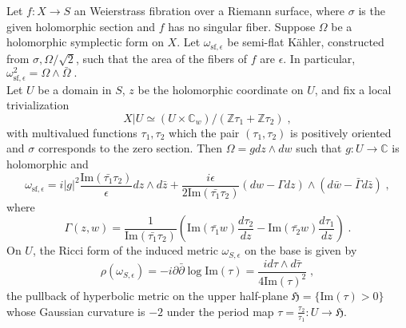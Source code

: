 \begin{prop}
Let $f\colon X\rightarrow S$ an Weierstrass fibration over a Riemann surface, where $\sigma$ is the given holomorphic section and $f$ has no singular fiber. Suppose $\Omega$ be a holomorphic symplectic form on $X$. Let $\omega_{\textrm{sf},\epsilon}$ be semi-flat K{\"a}hler, constructed from $\sigma,\Omega/\sqrt{2}$, such that the area of the fibers of $f$ are $\epsilon$. In particular, $\omega_{\textrm{sf},\epsilon}^2=\Omega\wedge\bar{\Omega}\; .$\\ \indent
Let $U$ be a domain in $S$, $z$ be the holomorphic coordinate on $U$, and fix a local trivialization $$X|U\simeq (U\times \mathbb{C}_w)/(\mathbb{Z}\tau_1+\mathbb{Z}\tau_2)\; ,$$ 
with multivalued functions $\tau_1,\tau_2$ which the pair $(\tau_1,\tau_2)$ is positively oriented and $\sigma$ corresponds to the zero section. Then $\Omega=gdz\wedge dw$ such that $g:U\rightarrow\mathbb{C}$ is holomorphic and
$$\omega_{\textrm{sf},\epsilon}=i|g|^2\frac{\textrm{Im} (\bar{\tau_1}\tau_2)}{\epsilon}dz\wedge d\bar{z}+\frac{i\epsilon}{2\textrm{Im} (\bar{\tau_1}\tau_2)}(dw-\Gamma dz)\wedge(d\bar{w}-\bar{\Gamma}d\bar{z})\; ,$$
where
$$\Gamma(z,w)=\frac{1}{\textrm{Im} (\bar{\tau_1}\tau_2)}\left(\textrm{Im} (\bar{\tau_1}w)\frac{d\tau_2}{dz}-\textrm{Im} (\bar{\tau_2}w)\frac{d\tau_1}{dz}\right)\; .$$
\indent On $U$, the Ricci form of the induced metric $\omega_{S,\epsilon}$ on the base is given by
$$\rho(\omega_{S,\epsilon})=-i\partial\bar{\partial}\log\textrm{Im} (\tau)=\frac{id\tau\wedge d\bar{\tau}}{4\textrm{Im} (\tau)^2}\; ,$$
the pullback of hyperbolic metric on the upper half-plane $\mathfrak{H}=\{\textrm{Im} (\tau)>0\}$ whose Gaussian curvature is $-2$  under the period map $\tau=\frac{\tau_2}{\tau_1}\colon U\rightarrow \mathfrak{H}$.
\end{prop}